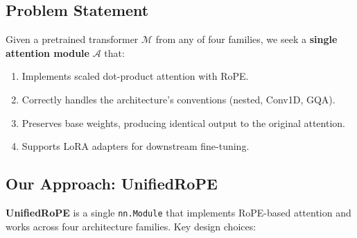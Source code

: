 \subsection{Problem Statement}

Given a pretrained transformer $\mathcal{M}$ from any of four families, we 
seek a \textbf{single attention module} $\mathcal{A}$ that:

\begin{enumerate}
\item Implements scaled dot-product attention with RoPE.
\item Correctly handles the architecture's conventions (nested, Conv1D, GQA).
\item Preserves base weights, producing identical output to the original
  attention.
\item Supports LoRA adapters for downstream fine-tuning.

\end{enumerate}
\subsection{Our Approach: UnifiedRoPE}

\textbf{UnifiedRoPE} is a single \texttt{nn.Module} that implements RoPE-based 
attention and works across four architecture families. Key design choices:

